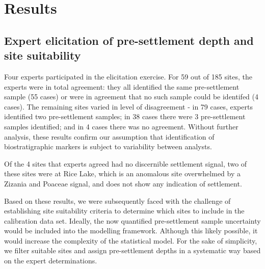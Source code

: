 \documentclass[12pt]{article}
\begin{document}


\section{Results}

\subsection{Expert elicitation of pre-settlement depth and site suitability}

Four experts participated in the elicitation exercise. For 59 out of
185 sites, the experts were in total agreement: they all identified
the same pre-settlement sample (55 cases) or were in agreement that no
such sample could be identifed (4 cases). The remaining sites varied
in level of disagreement - in 79 cases, experts identified two
pre-settlement samples; in 38 cases there were 3 pre-settlement
samples identified; and in 4 cases there was no agreement. Without
further analysis, these results confirm our assumption that
identification of biostratigraphic markers is subject to variability
between analysts. 

Of the 4 sites that experts agreed had no discernible settlement
signal, two of these sites were at Rice Lake, which is an anomalous
site overwhelmed by a Zizania and Poaceae signal, and does not show
any indication of settlement. 

Based on these results, we were subsequently faced with the challenge
of establishing site suitability criteria to determine which sites to
include in the calibration data set. Ideally, the now quantified
pre-settlement sample uncertainty would be included into the modelling
framework. Although this likely possible, it would increase the
complexity of the statistical model. For the sake of simplicity, we
filter suitable sites and assign pre-settlement depths in a systematic
way based on the expert determinations.
\end{document}
